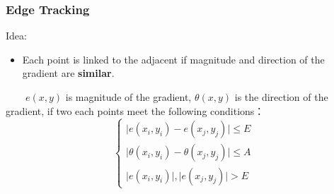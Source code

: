 \documentclass[notheorems,serif,table,compress]{beamer}  %
\begin{document}
\begin{frame}
\frametitle{Edge Tracking}
{\color{blue}Idea:}
    \begin{itemize}
        \item Each point is linked to the adjacent if magnitude and direction of the gradient are {\textbf{similar}}.\newline
    \end{itemize}
    \begin{tcolorbox}[colback=red!5,colframe=blue!75!black]
    ~~~~$e(x,y)$ is magnitude of the gradient, $\theta(x,y)$ is the direction of the gradient, if two each points meet the following conditions：
        \begin{displaymath}
            \left\{ \begin{array}{ll}
            \mid e(x_{i},y_{i})-e(x_{j},y_{j}) \mid \leq E\\
            \mid \theta(x_{i},y_{i})-\theta(x_{j},y_{j}) \mid \leq A\\
            \mid e(x_{i},y_{i}) \mid , \mid e(x_{j},y_{j}) \mid > E
             \end{array} \right.
    \end{displaymath}
    \end{tcolorbox}
\end{frame}

\end{document}
